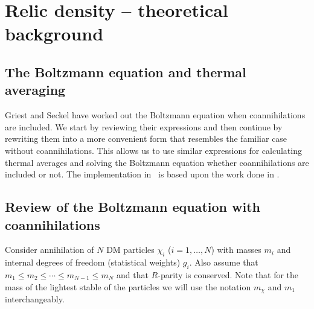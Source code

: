\section{Relic density -- theoretical background}


\subsection{The Boltzmann equation and thermal averaging}
\label{sec:Boltzmann}

Griest and Seckel \cite{Griest:1990kh} have worked out the Boltzmann
equation when coannihilations are included. We start by reviewing
their expressions and then continue by rewriting them into a more
convenient form that resembles the familiar case without
coannihilations. This allows us to use similar expressions for
calculating thermal averages and solving the Boltzmann equation
whether coannihilations are included or not. The implementation in
\ds\ is based upon the work done in \cite{Edsjo:1997bg}. 


\subsection{Review of the Boltzmann equation with coannihilations}
\label{RD:review}
Consider annihilation of $N$ DM particles $\chi_i$
($i=1,\ldots,N$) with masses $m_i$ and internal degrees of freedom
(statistical weights) $g_i$.  Also assume that $m_1 \leq m_2 \leq
\cdots \leq m_{N-1} \leq m_N$ and that $R$-parity is conserved. Note
that for the mass of the lightest stable of the particles we will use the
notation $m_{\chi}$ and $m_{1}$ interchangeably.

